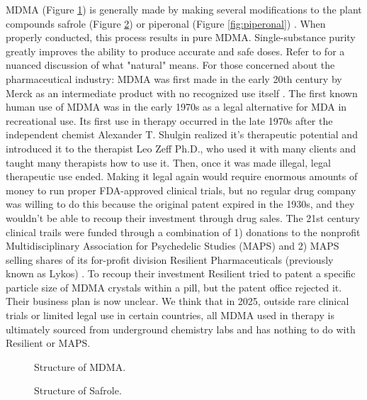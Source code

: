 \documentclass[12pt,letterpaper]{book}
\begin{document}
\begin{itemize}
        MDMA (Figure \ref{fig:mdma}) is generally made by making several modifications to the plant compounds safrole (Figure \ref{fig:safrole}) or piperonal (Figure \ref{fig:piperonal}) \cite{worldDrugReport,euMDMA}. When properly conducted, this process results in pure MDMA. Single-substance purity greatly improves the ability to produce accurate and safe doses. Refer to \textcite{ruggeriNatural} for a nuanced discussion of what "natural" means. For those concerned about the pharmaceutical industry: MDMA was first made in the early 20th century by Merck as an intermediate product with no recognized use itself \cite{passieHistory}. The first known human use of MDMA was in the early 1970s as a legal alternative for MDA in recreational use. Its first use in therapy occurred in the late 1970s after the independent chemist Alexander T. Shulgin realized it's therapeutic potential and introduced it to the therapist Leo Zeff Ph.D., who used it with many clients and taught many therapists how to use it. Then, once it was made illegal, legal therapeutic use ended. Making it legal again would require enormous amounts of money to run proper FDA-approved clinical trials, but no regular drug company was willing to do this because the original patent expired in the 1930s, and they wouldn't be able to recoup their investment through drug sales. The 21st century clinical trails were funded through a combination of 1) donations to the nonprofit Multidisciplinary Association for Psychedelic Studies (MAPS) and 2) MAPS selling shares of its for-profit division Resilient Pharmaceuticals (previously known as Lykos) \cite{lykosPatents}. To recoup their investment Resilient tried to patent a specific particle size of MDMA crystals within a pill, but the patent office rejected it. Their business plan is now unclear. We think that in 2025, outside rare clinical trials or limited legal use in certain countries, all MDMA used in therapy is ultimately sourced from underground chemistry labs and has nothing to do with Resilient or MAPS.
        \FloatBarrier
        \begin{figure}[htbp]
            \centering
            \caption{Structure of MDMA.}
            \label{fig:mdma}
        \end{figure}
        \begin{figure}[htbp]
            \centering
            \caption{Structure of Safrole.}
            \label{fig:safrole}
        \end{figure}

\end{itemize}
\end{document}
